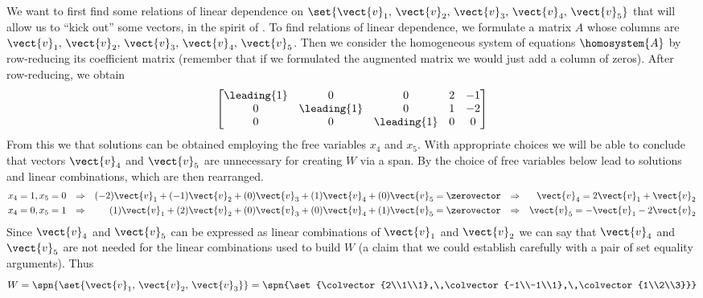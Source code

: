 We want to first find some relations of linear dependence on $\set{\vect{v}_1,\,\vect{v}_2,\,\vect{v}_3,\,\vect{v}_4,\,\vect{v}_5}$ that will allow us to ``kick out'' some vectors, in the spirit of .  To find relations of linear dependence, we formulate a matrix $A$ whose columns are $\vect{v}_1,\,\vect{v}_2,\,\vect{v}_3,\,\vect{v}_4,\,\vect{v}_5$.  Then we consider the homogeneous system of equations $\homosystem{A}$ by row-reducing its coefficient matrix (remember that if we formulated the augmented matrix we would just add a column of zeros).  After row-reducing, we obtain
%
\begin{equation*}
\begin{bmatrix}
\leading{1} & 0 & 0 & 2 & -1\\
0 & \leading{1} & 0 & 1 & -2\\
0 & 0 & \leading{1} & 0 & 0
\end{bmatrix}
\end{equation*}
%
From this we that solutions can be obtained employing the free variables $x_4$ and $x_5$.  With appropriate choices we will be able to conclude that vectors $\vect{v}_4$ and $\vect{v}_5$ are unnecessary for creating 
$W$ via a span.  By  the choice of free variables below lead to solutions and linear combinations, which are then rearranged.
%
\begin{align*}
x_4=1, x_5=0&&\Rightarrow&&(-2)\vect{v}_1+(-1)\vect{v}_2+(0)\vect{v}_3+(1)\vect{v}_4+(0)\vect{v}_5=\zerovector&&\Rightarrow&&\vect{v}_4=2\vect{v}_1+\vect{v}_2\\
x_4=0, x_5=1&&\Rightarrow&&(1)\vect{v}_1+(2)\vect{v}_2+(0)\vect{v}_3+(0)\vect{v}_4+(1)\vect{v}_5=\zerovector&&\Rightarrow&&\vect{v}_5=-\vect{v}_1-2\vect{v}_2\\
\end{align*}
%
Since $\vect{v}_4$ and $\vect{v}_5$ can be expressed as linear combinations of $\vect{v}_1$ and $\vect{v}_2$  we can say that $\vect{v}_4$ and $\vect{v}_5$ are not needed for the linear combinations used to build $W$ (a claim that we could establish carefully with a pair of set equality arguments).  Thus 
%
\begin{equation*}
W=\spn{\set{\vect{v}_1,\,\vect{v}_2,\,\vect{v}_3}}=\spn{\set{\colvector{2\\1\\1},\,\colvector{-1\\-1\\1},\,\colvector{1\\2\\3}}}
\end{equation*}
